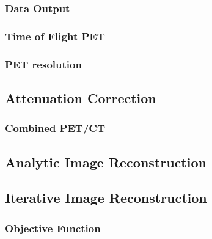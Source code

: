             \subsubsection{Data Output} \label{data_output}
                \blindtext
            
            \subsubsection{Time of Flight PET} \label{tof_pet}
                \blindtext
            
            \subsubsection{PET resolution} \label{pet_resolution}
                \blindtext
            
        \subsection{Attenuation Correction} \label{attenuation_correction}
            \blindtext
            
                \subsubsection{Combined PET/CT} \label{combined_pet_ct}
                    \blindtext
    
        \blindtext
        
        \subsection{Analytic Image Reconstruction} \label{analytic_image_reconstruction}
            \blindtext
        
        \subsection{Iterative Image Reconstruction} \label{iterative_image_reconstruction}
            \blindtext
            
            \subsubsection{Objective Function} \label{iterative_image_reconstruction_objective_function}
                \blindtext
                
